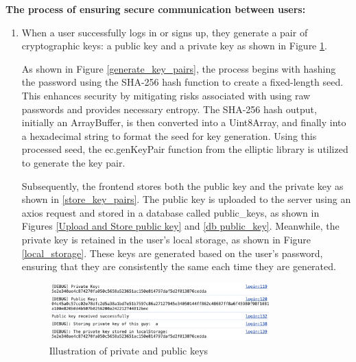 \documentclass[12pt]{article}
\begin{document}
        \textbf{The process of ensuring secure communication between users:}
        \begin{enumerate}
            \item When a user successfully logs in or signs up, they generate a pair of cryptographic keys: a public key and a private key as shown in Figure \ref{show_keys}.

            As shown in Figure \ref{generate_key_pairs}, the process begins with hashing the password using the SHA-256 hash function to create a fixed-length seed. This enhances security by mitigating risks associated with using raw passwords and provides necessary entropy. The SHA-256 hash output, initially an ArrayBuffer, is then converted into a Uint8Array, and finally into a hexadecimal string to format the seed for key generation. Using this processed seed, the ec.genKeyPair function from the elliptic library is utilized to generate the  key pair.
            
            Subsequently, the frontend stores both the public key and the private key as shown in \ref{store_key_pairs}. The public key is uploaded to the server using an axios request and stored in a database called public\_keys, as shown in Figures \ref{Upload and Store public key} and \ref{db public_key}. Meanwhile, the private key is retained in the user's local storage, as shown in Figure \ref{local_storage}. These keys are generated based on the user's password, ensuring that they are consistently the same each time they are generated.

            \begin{figure}[H]
                \centering
                \includegraphics[width=0.8\textwidth]{graphs/show_keys.jpg}
                \caption{Illustration of private and public keys}
                \label{show_keys}
            \end{figure}


\end{enumerate}
\end{document}
